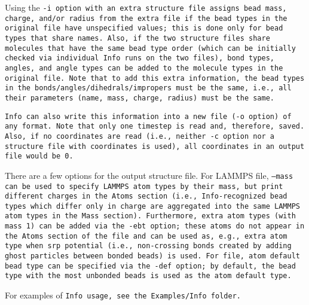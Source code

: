 Using the \tt{-i} option with an extra structure file assigns bead mass, charge,
and/or radius from the extra file if the bead types in the original file have
unspecified values; this is done only for bead types that share names. Also, if
the two structure files share molecules that have the same bead type order
(which can be initially checked via individual \tt{Info} runs on the two files),
bond types, angles, and angle types can be added to the molecule types in the
original file. Note that to add this extra information, the bead types in the
bonds/angles/dihedrals/impropers must be the same, i.e., all their parameters
(name, mass, charge, radius) must be the same.

\tt{Info} can also write this information into a new file (\tt{-o} option) of
any format. Note that only one timestep is read and, therefore, saved. Also, if
no coordinates are read (i.e., neither \tt{-c} option nor a structure file with
coordinates is used), all coordinates in an output file would be 0.


There are a few options for the output structure file. For LAMMPS \data file,
\tt{--mass} can be used to specify LAMMPS atom types by their mass, but print
different charges in the \tt{Atoms} section (i.e., \tt{Info}-recognized bead
types which differ only in charge are aggregated into the same LAMMPS atom types
in the \tt{Mass} section). Furthermore, extra atom types (with mass 1) can be
added via the \tt{-ebt} option; these atoms do not appear in the \tt{Atoms}
section of the \data file and can be used as, e.g., extra atom type when srp
potential (i.e., non-crossing bonds created by adding ghost particles between
bonded beads) is used. For \vtsf file, \tt{atom default} bead type can be
specified via the \tt{-def} option; by default, the bead type with the most
unbonded beads is used as the \tt{atom default} type.

For examples of \tt{Info} usage, see the \tt{Examples/Info} folder.

